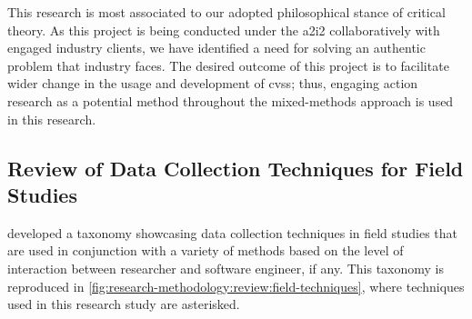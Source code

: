 This research is most associated to our adopted philosophical stance of critical theory. As this project is being conducted under the \gls{a2i2} collaboratively with engaged industry clients, we have identified a need for solving an authentic problem that industry faces. The desired outcome of this project is to facilitate wider change in the usage and development of \glspl{cvs}; thus, engaging action research as a potential method throughout the mixed-methods approach is used in this research.

\subsection{Review of Data Collection Techniques for Field Studies}
\label{ssec:research-methodology:review:techniques}

\citeauthor{Singer:2007tu} developed a taxonomy \citep{Singer:2007tu,Lethbridge:2005jv} showcasing data collection techniques in field studies that are used in conjunction with a variety of methods based on the level of interaction between researcher and software engineer, if any. This taxonomy is reproduced in \cref{fig:research-methodology:review:field-techniques}, where techniques used in this research study are asterisked.

